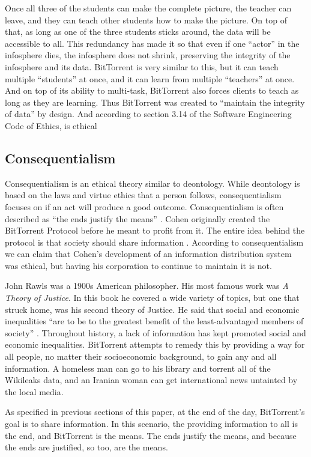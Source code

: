 \documentclass[11pt]{article}
\begin{document}
\begin{multicols}{2}
Once all three of the students can make the complete picture, the teacher can leave, and they can teach other students how to make the picture. On top of that, as long as one of the three students sticks around, the data will be accessible to all. This redundancy has made it so that even if one ``actor'' in the infosphere dies, the infosphere does not shrink, preserving the integrity of the infosphere and its data. BitTorrent is very similar to this, but it can teach multiple ``students'' at once, and it can learn from multiple ``teachers'' at once. And on top of its ability to multi-task, BitTorrent also forces clients to teach as long as they are learning. Thus BitTorrent was created to ``maintain the integrity of data'' by design. And according to section 3.14 of the Software Engineering Code of Ethics, is ethical

\subsection{Consequentialism}

Consequentialism is an ethical theory similar to deontology. While deontology is based on the laws and virtue ethics that a person follows, consequentialism focuses on if an act will produce a good outcome. Consequentialism is often described as ``the ends justify the means'' \cite{cons}. Cohen originally created the BitTorrent Protocol before he meant to profit from it. The entire idea behind the protocol is that society should share information \cite{btspec}. According to consequentialism we can claim that Cohen's development of an information distribution system was ethical, but having his corporation to continue to maintain it is not.

John Rawls was a 1900s American philosopher. His most famous work was \textit{A Theory of Justice}. In this book he covered a wide variety of topics, but one that struck home, was his second theory of Justice. He said that social and economic inequalities ``are to be to the greatest benefit of the least-advantaged members of society'' \cite{rawls}. Throughout history, a lack of information has kept promoted social and economic inequalities. BitTorrent attempts to remedy this by providing a way for all people, no matter their socioeconomic background, to gain any and all information. A homeless man can go to his library and torrent all of the Wikileaks data, and an Iranian woman can get international news untainted by the local media.

As specified in previous sections of this paper, at the end of the day, BitTorrent's goal is to share information. In this scenario, the providing information to all is the end, and BitTorrent is the means. The ends justify the means, and because the ends are justified, so too, are the means.


\end{multicols}
\end{document}

